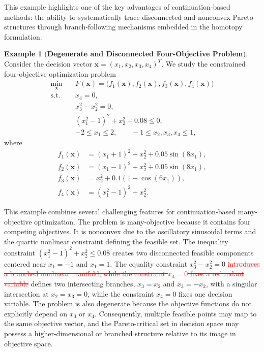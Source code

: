 \documentclass[11pt,pdflatex,sn-mathphys-ay]{sn-jnl}%
\theoremstyle{definition}
\theoremstyle{thmstyleone}%
\theoremstyle{thmstyletwo}%
\newtheorem{example}{Example}%
\theoremstyle{thmstylethree}%
\newcommand{\del}[1]{\textcolor{red}{\sout{#1}}}
\newcommand{\add}[1]{\textcolor{revisionblue}{#1}}
\begin{document}
	
	This example highlights one of the key advantages of continuation-based methods: the ability to systematically trace disconnected and nonconvex Pareto structures through branch-following mechanisms embedded in the homotopy formulation.
	
	\begin{example}[\textbf{Degenerate and Disconnected Four-Objective Problem}]
		
		Consider the decision vector \(\bm{x}=(x_1,x_2,x_3,x_4)^T\). We study the constrained four-objective optimization problem
		\begin{equation}
			\label{eq:degenerate_disconnected_mop_eq}
			\begin{aligned}
				\min_{\bm{x}}\quad
				&F(\bm{x})=
				\bigl(f_1(\bm{x}),f_2(\bm{x}),f_3(\bm{x}),f_4(\bm{x})\bigr)\\
				\text{s.t.}\quad
				&x_4=0,\\
				&x_3^2-x_2^2=0,\\
				&(x_1^2-1)^2+x_2^2-0.08\le 0,\\
				&-2\le x_1\le 2,\qquad -1\le x_2,x_3,x_4\le 1,
			\end{aligned}
		\end{equation}
		where
		\begin{equation}
			\label{eq:degenerate_disconnected_objectives_eq}
			\begin{aligned}
				f_1(\bm{x})&=(x_1+1)^2+x_2^2+0.05\sin(8x_1),\\
				f_2(\bm{x})&=(x_1-1)^2+x_2^2+0.05\sin(8x_1),\\
				f_3(\bm{x})&=x_2^2+0.1(1-\cos(6x_1)),\\
				f_4(\bm{x})&=(x_1^2-1)^2+x_2^2.
			\end{aligned}
		\end{equation}
	\end{example}
	
	This example combines several challenging features for continuation-based many-objective optimization. The problem is many-objective because it contains four competing objectives. It is nonconvex due to the oscillatory sinusoidal terms and the quartic nonlinear constraint defining the feasible set. The inequality constraint \((x_1^2-1)^2+x_2^2\le0.08\) creates two disconnected feasible components centered near \(x_1=-1\) and \(x_1=1\). The equality constraint \(x_3^2-x_2^2=0\) \del{introduces a branched nonlinear manifold, while the constraint \(x_4=0\) fixes a redundant variable} \add{defines two intersecting branches, $x_3=x_2$ and $x_3=-x_2$, with a singular intersection at $x_2=x_3=0$, while the constraint $x_4=0$
		fixes one decision variable}. The problem is also degenerate because the objective functions do not explicitly depend on \(x_3\) or \(x_4\). Consequently, multiple feasible points may map to the same objective vector, and the Pareto-critical set in decision space may possess a higher-dimensional or branched structure relative to its image in objective space.
	
\end{document}
